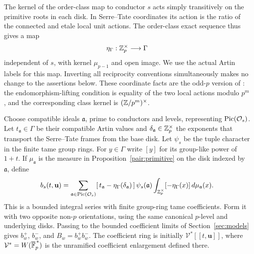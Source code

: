 The kernel of the order-class map to conductor \(s\) acts simply
transitively on the primitive roots in each disk.  In Serre--Tate
coordinates its action is the ratio of the connected and etale local
unit actions.  The order-class exact sequence thus gives a map
\[
 \eta_\Gamma:\mathbb Z_p^\times\longrightarrow\Gamma
\]
independent of \(s\), with kernel \(\mu_{p-1}\) and open image.
We use the actual Artin labels for this map.  Inverting all reciprocity
conventions simultaneously makes no change to the assertions below.
These coordinate facts are the odd-\(p\) version of
\cite[Section~8, \emph{CM disk coordinates}]{B}:
the endomorphism-lifting condition is equality of the two local
actions modulo \(p^m\), and the corresponding class kernel is
\((\mathbb Z/p^m)^\times\).

Choose compatible ideals \(\mathfrak a\), prime to conductors and
levels, representing \(\operatorname{Pic}(\mathcal O_s)\).  Let
\(t_{\mathfrak a}\in\Gamma\) be their compatible Artin values and
\(\delta_{\mathfrak a}\in\mathbb Z_p^\times\) the exponents that transport
the Serre--Tate frames from the base disk.  Let
\(\psi_s\) be the tuple character in the finite tame group rings.
For \(y\in\Gamma\) write \([y]\) for its group-like power of \(1+t\).
If \(\mu_{\mathfrak a}\) is the measure in
Proposition~\ref{pair:primitive} on the disk indexed by \(\mathfrak a\),
define
\[
 b_s(t,\mathbf u)=
 \sum_{\mathfrak a\in\operatorname{Pic}(\mathcal O_s)}
 [\,t_{\mathfrak a}-\eta_\Gamma(\delta_{\mathfrak a})\,]\,
 \psi_s(\mathfrak a)
 \int_{\mathbb Z_p^\times}[-\eta_\Gamma(x)]\,d\mu_{\mathfrak a}(x).
\]
This is a bounded integral series with finite group-ring tame
coefficients.  Form it with two opposite non-\(p\) orientations,
using the same canonical \(p\)-level and underlying disks.
Passing to the bounded coefficient limits of Section~\ref{sec:models}
gives \(b_w^+\), \(b_w^-\), and
\(B_w=b_w^+b_w^-\).  The coefficient ring is initially
\(\mathcal V^*[[t,\mathbf u]]\), where
\(\mathcal V^*=W(\overline{\mathbb F}_p^{\,*})\) is the unramified
coefficient enlargement defined there.

